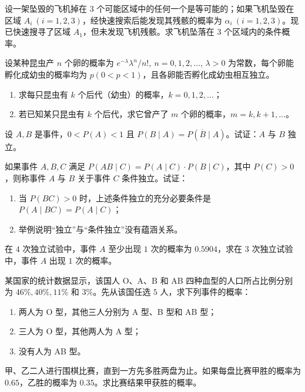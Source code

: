 \begin{homework}[1.27]
设一架坠毁的飞机掉在 $3$ 个可能区域中的任何一个是等可能的；如果飞机坠毁在区域 $A_i\ (i=1,2,3)$，经快速搜索后能发现其残骸的概率为 $\alpha_i\ (i=1,2,3)$。现已快速搜寻了区域 $A_1$，但未发现飞机残骸。求飞机坠落在 $3$ 个区域内的条件概率。
\end{homework}

\begin{homework}[1.28]
设某种昆虫产 $n$ 个卵的概率为 $e^{-\lambda}\lambda^n/n!,\ n=0,1,2,\dots$, $\lambda>0$ 为常数，每个卵能孵化成幼虫的概率均为 $p(0<p<1)$，且各卵能否孵化成幼虫相互独立。

\begin{enumerate}
  \item 求每只昆虫有 $k$ 个后代（幼虫）的概率，$k=0,1,2,\dots$；
  \item 若已知某只昆虫有 $k$ 个后代，求它曾产了 $m$ 个卵的概率，$m=k,k+1,\dots$。
\end{enumerate}
\end{homework}

\begin{homework}[1.29]
设 $A,B$ 是事件，$0<P(A)<1$ 且 $P(B\mid A)=P(\overline{B}\mid A)$。试证：$A$ 与 $B$ 独立。
\end{homework}

\begin{homework}[1.30]
如果事件 $A,B,C$ 满足 $P(AB\mid C)=P(A\mid C)\cdot P(B\mid C)$，其中 $P(C)>0$，则称事件 $A$ 与 $B$ 关于事件 $C$ 条件独立。试证：

\begin{enumerate}
  \item 当 $P(BC)>0$ 时，上述条件独立的充分必要条件是 $P(A\mid BC)=P(A\mid C)$；
  \item 举例说明“独立”与“条件独立”没有蕴涵关系。
\end{enumerate}
\end{homework}

\begin{homework}[1.31]
在 $4$ 次独立试验中，事件 $A$ 至少出现 $1$ 次的概率为 $0.5904$，求在 $3$ 次独立试验中，事件 $A$ 出现 $1$ 次的概率。
\end{homework}

\begin{homework}[1.32]
某国家的统计数据显示，该国人 O、A、B 和 AB 四种血型的人口所占比例分别为 $46\%,40\%,11\%$ 和 $3\%$。先从该国任选 $5$ 人，求下列事件的概率：

\begin{enumerate}
  \item 两人为 O 型，其他三人分别为 A 型、B 型和 AB 型；
  \item 三人为 O 型，其他两人为 A 型；
  \item 没有人为 AB 型。
\end{enumerate}
\end{homework}
\begin{homework}[1.33]
甲、乙二人进行围棋比赛，直到一方先多胜两盘为止。如果每盘比赛甲胜的概率为 $0.65$，乙胜的概率为 $0.35$。求比赛结果甲获胜的概率。
\end{homework}

